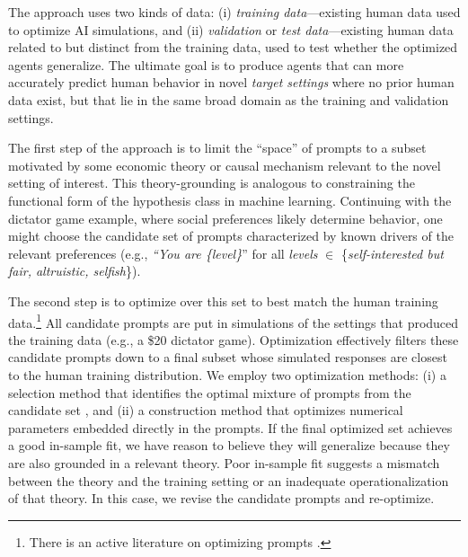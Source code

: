 \documentclass[11pt]{article}
\theoremstyle{definition}
\newcommand{\persona}{prompt}
\begin{document}
The approach uses two kinds of data: (i) \emph{training data}---existing human data used to optimize AI simulations, and (ii) \emph{validation} or \emph{test data}---existing human data related to but distinct from the training data, used to test whether the optimized agents generalize.
The ultimate goal is to produce agents that can more accurately predict human behavior in novel \emph{target settings} where no prior human data exist, but that lie in the same broad domain as the training and validation settings.

The first step of the approach is to limit the ``space'' of \persona{s} to a subset motivated by some economic theory or causal mechanism relevant to the novel setting of interest.
This theory-grounding is analogous to constraining the functional form of the hypothesis class in machine learning.
Continuing with the dictator game example, where social preferences likely determine behavior, one might choose the candidate set of \persona{s} characterized by known drivers of the relevant preferences (e.g., \emph{``You are \{level\}}'' for all \emph{levels} $\in$ \{\emph{self-interested but fair, altruistic, selfish}\}).

The second step is to optimize over this set to best match the human training data.\footnote{There is an active literature on optimizing prompts \citep{khattab2024dspy}.}
All candidate \persona{s} are put in simulations of the settings that produced the training data (e.g., a \$20 dictator game).
Optimization effectively filters these candidate \persona{s} down to a final subset whose simulated responses are closest to the human training distribution.
We employ two optimization methods: (i) a selection method that identifies the optimal mixture of \persona{s} from the candidate set \citep{leng2024calibrate,Jackson2025Mixture,bui2025mixture}, and (ii) a construction method that optimizes numerical parameters embedded directly in the prompts.
If the final optimized set achieves a good in-sample fit, we have reason to believe they will generalize because they are also grounded in a relevant theory.
Poor in-sample fit suggests a mismatch between the theory and the training setting or an inadequate operationalization of that theory.
In this case, we revise the candidate \persona{s} and re-optimize.
\end{document}
